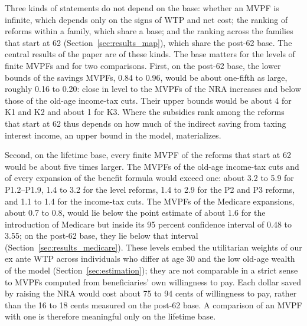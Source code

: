 Three kinds of statements do not depend on the base: whether an MVPF is infinite, which depends only on the signs of WTP and net cost; the ranking of reforms within a family, which share a base; and the ranking across the families that start at 62 (Section~\ref{sec:results_map}), which share the post-62 base. The central results of the paper are of these kinds. The base matters for the levels of finite MVPFs and for two comparisons. First, on the post-62 base, the lower bounds of the savings MVPFs, 0.84 to 0.96, would be about one-fifth as large, roughly 0.16 to 0.20: close in level to the MVPFs of the NRA increases and below those of the old-age income-tax cuts. Their upper bounds would be about 4 for K1 and K2 and about 1 for K3. %
Where the subsidies rank among the reforms that start at 62 thus depends on how much of the indirect saving from taxing interest income, an upper bound in the model, materializes.

Second, on the lifetime base, every finite MVPF of the reforms that start at 62 would be about five times larger. The MVPFs of the old-age income-tax cuts and of every expansion of the benefit formula would exceed one: about 3.2 to 5.9 for P1.2--P1.9, 1.4 to 3.2 for the level reforms, 1.4 to 2.9 for the P2 and P3 reforms, and 1.1 to 1.4 for the income-tax cuts. %
The MVPFs of the Medicare expansions, about 0.7 to 0.8, would lie below the point estimate of about 1.6 for the introduction of Medicare but inside its 95 percent confidence interval of 0.48 to 3.55; on the post-62 base, they lie below that interval (Section~\ref{sec:results_medicare}). These levels embed the utilitarian weights of our ex ante WTP across individuals who differ at age 30 and the low old-age wealth of the model (Section~\ref{sec:estimation}); they are not comparable in a strict sense to MVPFs computed from beneficiaries' own willingness to pay. Each dollar saved by raising the NRA would cost about 75 to 94 cents of willingness to pay, rather than the 16 to 18 cents measured on the post-62 base. %
A comparison of an MVPF with one is therefore meaningful only on the lifetime base.

